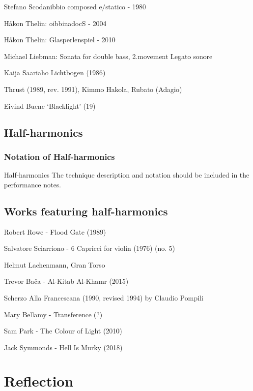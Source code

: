 Stefano Scodanibbio composed e/statico - 1980

Håkon Thelin: oibbinadocS - 2004

Håkon Thelin: Glasperlenspiel - 2010

Michael Liebman: Sonata for double bass, 2.movement Legato sonore


Kaija Saariaho Lichtbogen (1986)

Thrust (1989, rev. 1991),  Kimmo Hakola, Rubato (Adagio) 

Eivind Buene `Blacklight' (19)



\subsection{Half-harmonics}

\subsubsection{Notation of Half-harmonics}
Half-harmonics 
The technique description and notation should be included in the performance notes.


\subsection{Works featuring half-harmonics}

Robert Rowe - Flood Gate (1989)

Salvatore Sciarriono - 6 Capricci for violin (1976) (no. 5)

Helmut Lachenmann, Gran Torso

Trevor Bača - Al-Kitab Al-Khamr (2015)

Scherzo Alla Francescana (1990, revised 1994) by Claudio Pompili 

Mary Bellamy - Transference (?)

Sam Park - The Colour of Light (2010)

Jack Symmonds - Hell Is Murky (2018)

\section{Reflection}




\lipsum[4]